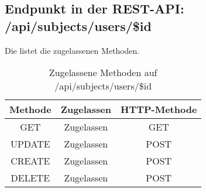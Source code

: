 \subsection{Endpunkt in der REST-API: /api/subjects/users/\$id}
Die  listet die zugelassenen Methoden. 

\begin{table}[!htbp]
	\begin{tabular}{|c|c|c|}
		\hline
			\textbf{Methode} & \textbf{Zugelassen} & \textbf{HTTP-Methode} \\ \hline
			GET & Zugelassen & GET \\ \hline
			UPDATE & Zugelassen & POST \\ \hline 
			CREATE & Zugelassen & POST \\ \hline 
			DELETE & Zugelassen & POST \\ \hline
	\end{tabular}

		\caption{Zugelassene Methoden auf /api/subjects/users/\$id}
		\label{tab:end:rest:api:subjects:users:id:meth}
\end{table}